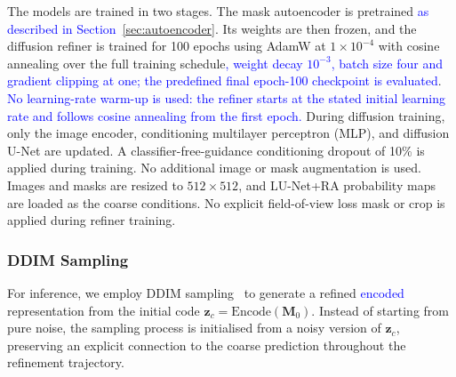 \documentclass[jimaging,article,submit,pdftex,moreauthors]
  {Definitions/mdpi}
\DeclareRobustCommand{\rev}[1]{\textcolor{blue}{#1}}
\DeclareRobustCommand{\rev}[1]{#1}
\providecommand{\linelabel}[1]{}
\newcommand{\seclabel}[1]{\linelabel{rev:sec:#1}}
\newcommand{\secend}[1]{\linelabel{rev:end:#1}}
\begin{document}
The models are trained in two stages. The mask autoencoder is pretrained \rev{as described in Section~\ref{sec:autoencoder}}. Its weights are then frozen, and the diffusion refiner is trained for 100 epochs using AdamW at $1\times10^{-4}$ with cosine annealing over the full training schedule\rev{, weight decay $10^{-3}$, batch size four and gradient clipping at one; the predefined final epoch-100 checkpoint is evaluated}. \rev{No learning-rate warm-up is used: the refiner starts at the stated initial learning rate and follows cosine annealing from the first epoch.} During diffusion training, only the image encoder, conditioning multilayer perceptron (MLP), and diffusion U-Net are updated. A classifier-free-guidance conditioning dropout of 10\% is applied during training. No additional image or mask augmentation is used. Images and masks are resized to $512\times512$, and LU-Net+RA probability maps are loaded as the coarse conditions. No explicit field-of-view loss mask or crop is applied during refiner training.\secend{objective}

\subsubsection{DDIM Sampling}
\label{sec:ddim_sampling}
\seclabel{ddim_sampling}

For inference, we employ DDIM sampling~\cite{Song2021} to generate a refined \rev{encoded} representation from the initial code $\mathbf{z}_c=\mathrm{Encode}(\mathbf{M}_0)$. Instead of starting from pure noise, the sampling process is initialised from a noisy version of $\mathbf{z}_c$, preserving an explicit connection to the coarse prediction throughout the refinement trajectory.
\end{document}
